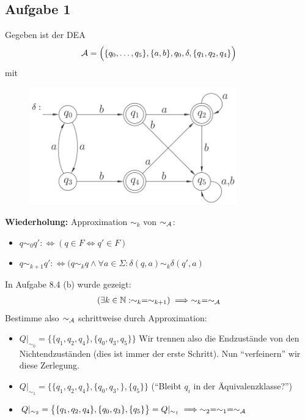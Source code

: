\subsection{Aufgabe 1}
Gegeben ist der DEA
\begin{align*}
	\mathcal{A}=\Big(\lbrace q_0,\ldots,q_5\rbrace,\lbrace a,b\rbrace,q_0,\delta,\lbrace q_1,q_2,q_4\rbrace\Big)
\end{align*}
mit
\begin{figure}[H] 
	\begin{center}
		\includegraphics[width=0.8\textwidth]{pics/Blatt9.png}
	\end{center}
\end{figure}

\textbf{Wiederholung:} Approximation $\sim_k$ von $\sim_{\mathcal{A}}$:
\begin{itemize}
	\item $q\sim_0 q':\Longleftrightarrow (q\in F\Leftrightarrow q'\in F)$
	\item $q\sim_{k+1} q':\Longleftrightarrow(q\sim_k q\wedge\forall a\in\Sigma:\delta(q,a)\sim_k\delta(q',a)$
\end{itemize}
In Aufgabe 8.4 (b) wurde gezeigt:
\begin{align*}
	(\exists k\in\mathbb{N}:\sim_k=\sim_{k+1})\implies\sim_k=\sim_{\mathcal{A}}
\end{align*}
Bestimme also $\sim_{\mathcal{A}}$ schrittweise durch Approximation:
\begin{itemize}
	\item $Q|_{\sim_0}=\big\lbrace\lbrace q_1,q_2,q_4\rbrace,\lbrace q_0,q_3,q_5\rbrace\big\rbrace$ Wir trennen also die Endzustände von den Nichtendzuständen (dies ist immer der erste Schritt). Nun ``verfeinern'' wir diese Zerlegung.
	\item $Q|_{\sim_1}=\big\lbrace\lbrace q_1,q_2,q_4\rbrace,\lbrace q_0,q_3,\rbrace,\lbrace q_5\rbrace\big\rbrace$ (``Bleibt $q_i$ in der Äquivalenzklasse?'')
	\item $Q|_{\sim_2}=\big\lbrace\lbrace q_1,q_2,q_4\rbrace,\lbrace q_0,q_3\rbrace,\lbrace q_5\rbrace\big\rbrace=Q|_{\sim_1}\implies \sim_2=\sim_1=\sim_{\mathcal{A}}$ 
\end{itemize}

